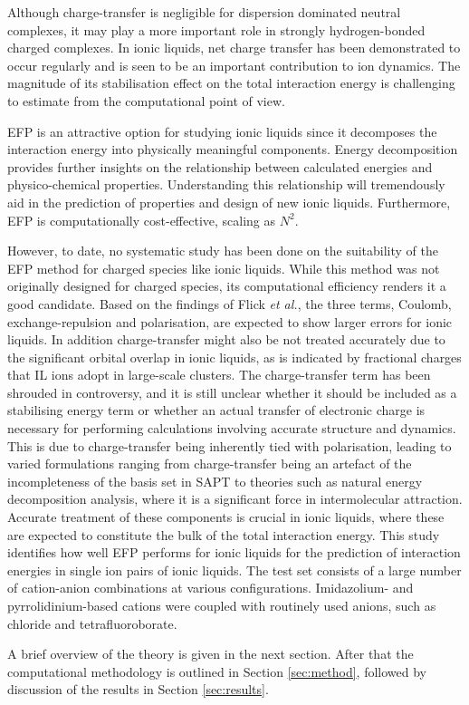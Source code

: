 Although charge-transfer is negligible for dispersion dominated neutral complexes, it may play a more important role in strongly hydrogen-bonded charged complexes.
In ionic liquids, net charge transfer has been demonstrated to occur regularly and is seen to be an important contribution to ion dynamics. 
\cite{Izgorodina2011a} 
The magnitude of its stabilisation effect on the total interaction energy is challenging to estimate from the computational point of view.


EFP is an attractive option for studying ionic liquids since it decomposes the interaction energy into physically meaningful components.
Energy decomposition provides further insights on the relationship between calculated energies and physico-chemical properties.\cite{Izgorodina2014a}
Understanding this relationship will tremendously aid in the prediction of properties and design of new ionic liquids.
Furthermore, EFP is computationally cost-effective, scaling as $N^2$.
\cite{Flick2012a}


However, to date, no systematic study has been done on the suitability of the EFP method for charged species like ionic liquids. 
While this method was not originally designed for charged species, its computational efficiency renders it a good candidate. 
Based on the findings of Flick \emph{et al.}, 
\cite{Flick2012a}
the three terms, Coulomb, exchange-repulsion and polarisation, are expected to show larger errors for ionic liquids. 
In addition charge-transfer might also be not treated accurately due to the significant orbital overlap in ionic liquids, as is indicated by fractional charges that IL ions adopt in large-scale clusters.
\cite{Schmidt2010a, Dommert2012a, Dommert2014a, Rigby2013a, Wendler2012a}
The charge-transfer term has been shrouded in controversy, and it is still unclear whether it should be included as a stabilising energy term or whether an actual transfer of electronic charge is necessary for performing calculations involving accurate structure and dynamics.
\cite{Ramesh2008a, Robertson2002a, Thompson2000a, Lee2011a, Piquemal2006a, Kumar2011a}
This is due to charge-transfer being inherently tied with polarisation, leading to varied formulations ranging from charge-transfer being an artefact of the incompleteness of the basis set in SAPT to theories such as natural energy decomposition analysis,
\cite{Schenter1996a, Glendening2005a}
where it is a significant force in intermolecular attraction.
Accurate treatment of these components is crucial in ionic liquids, where these are expected to constitute the bulk of the total interaction energy.
This study identifies how well EFP performs for ionic liquids for the prediction of interaction energies in single ion pairs of ionic liquids.
The test set consists of a large number of cation-anion combinations at various configurations.
Imidazolium- and pyrrolidinium-based cations were coupled with routinely used anions, such as chloride and tetrafluoroborate.


A brief overview of the theory is given in the next section. 
After that the computational methodology is outlined in Section \ref{sec:method}, followed by discussion of the results in Section \ref{sec:results}.
